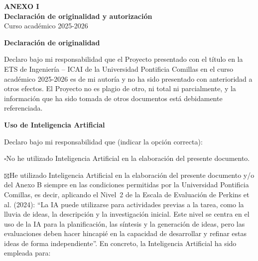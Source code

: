 \thispagestyle{empty}
\begin{center}
  {\large\bfseries ANEXO I}\\[0.4em]
  {\large\bfseries Declaración de originalidad y autorización}\\[0.4em]
  {\normalsize Curso académico 2025-2026}
\end{center}

\vspace{1.2em}

\noindent\textbf{Declaración de originalidad}

\vspace{0.4em}

\noindent Declaro bajo mi responsabilidad que el Proyecto presentado con el título
\emph{\tituloTFM} en la ETS de Ingeniería – ICAI de la Universidad Pontificia Comillas
en el curso académico 2025-2026 es de mi autoría y no ha sido presentado con
anterioridad a otros efectos. El Proyecto no es plagio de otro, ni total ni
parcialmente, y la información que ha sido tomada de otros documentos está debidamente
referenciada.

\vspace{1.2em}

\noindent\textbf{Uso de Inteligencia Artificial}

\vspace{0.4em}

\noindent Declaro bajo mi responsabilidad que (indicar la opción correcta):

\vspace{0.6em}

\noindent$\square$\quad No he utilizado Inteligencia Artificial en la elaboración del
presente documento.

\vspace{0.5em}

\noindent$\boxtimes$\quad He utilizado Inteligencia Artificial en la elaboración del
presente documento y/o del Anexo B siempre en las condiciones permitidas por la
Universidad Pontificia Comillas, es decir, aplicando el Nivel~2 de la Escala de
Evaluación de Perkins et al. (2024): \enquote{La IA puede utilizarse para actividades
previas a la tarea, como la lluvia de ideas, la descripción y la investigación
inicial. Este nivel se centra en el uso de la IA para la planificación, las síntesis y
la generación de ideas, pero las evaluaciones deben hacer hincapié en la capacidad de
desarrollar y refinar estas ideas de forma independiente}. En concreto, la
Inteligencia Artificial ha sido empleada para:

